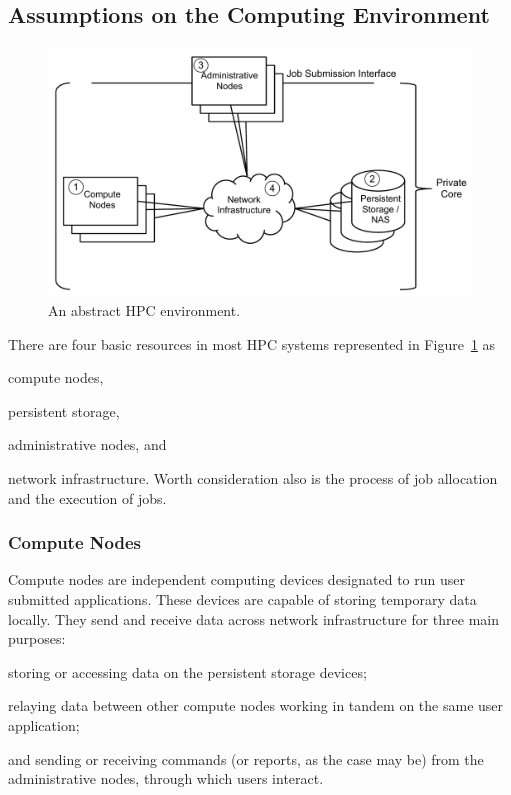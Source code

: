 \documentclass[oneside,12pt]{memoir}
\begin{document}
\subsection{Assumptions on the Computing Environment}
\begin{figure}
\centering
\includegraphics[scale=0.7]{abstract_hpc_environment.pdf}
\caption{An abstract HPC environment.}
\label{fig:abstract_hpc_environment}
\end{figure}
There are four basic resources in most HPC systems represented in Figure~\ref{fig:abstract_hpc_environment} as \begin{inparaenum}
\item compute nodes, \item persistent storage, \item administrative nodes, and \item network infrastructure. Worth consideration also is the process of job allocation and the execution of jobs.\end{inparaenum}
\subsubsection{Compute Nodes}
Compute nodes are independent computing devices designated to run user submitted applications. These devices are capable of storing temporary data locally. They send and receive data across network infrastructure for three main purposes:\begin{inparaenum}
\item storing or accessing data on the persistent storage devices;
\item relaying data between other compute nodes working in tandem on the same user application;
\item and sending or receiving commands (or reports, as the case may be) from the administrative nodes, through which users interact.\end{inparaenum} 
\end{document}
